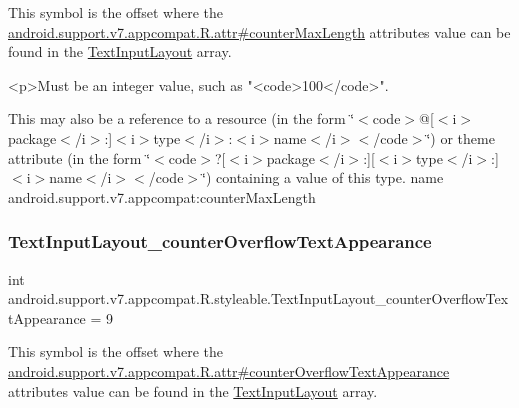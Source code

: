 This symbol is the offset where the \hyperlink{classandroid_1_1support_1_1v7_1_1appcompat_1_1R_1_1attr_a3ac08d5d35fcfeb3c8d8166422cce804}{android.\+support.\+v7.\+appcompat.\+R.\+attr\#counter\+Max\+Length} attribute\textquotesingle{}s value can be found in the \hyperlink{classandroid_1_1support_1_1v7_1_1appcompat_1_1R_1_1styleable_a618db13ebe8aab96f9d951a0d1c7d5bc}{Text\+Input\+Layout} array.

\begin{DoxyVerb}      <p>Must be an integer value, such as "<code>100</code>".
\end{DoxyVerb}
 

This may also be a reference to a resource (in the form \char`\"{}$<$code$>$@\mbox{[}$<$i$>$package$<$/i$>$\+:\mbox{]}$<$i$>$type$<$/i$>$\+:$<$i$>$name$<$/i$>$$<$/code$>$\char`\"{}) or theme attribute (in the form \char`\"{}$<$code$>$?\mbox{[}$<$i$>$package$<$/i$>$\+:\mbox{]}\mbox{[}$<$i$>$type$<$/i$>$\+:\mbox{]}$<$i$>$name$<$/i$>$$<$/code$>$\char`\"{}) containing a value of this type.  name android.\+support.\+v7.\+appcompat\+:counter\+Max\+Length \mbox{\label{classandroid_1_1support_1_1v7_1_1appcompat_1_1R_1_1styleable_af52e4bb48c3468ccf7ac636439c45789}} 
\subsubsection{\texorpdfstring{Text\+Input\+Layout\+\_\+counter\+Overflow\+Text\+Appearance}{TextInputLayout\_counterOverflowTextAppearance}}
{\footnotesize\ttfamily int android.\+support.\+v7.\+appcompat.\+R.\+styleable.\+Text\+Input\+Layout\+\_\+counter\+Overflow\+Text\+Appearance = 9\hspace{0.3cm}{\ttfamily [static]}}

This symbol is the offset where the \hyperlink{classandroid_1_1support_1_1v7_1_1appcompat_1_1R_1_1attr_a413f70c3f970308cb81b4d96766b3a20}{android.\+support.\+v7.\+appcompat.\+R.\+attr\#counter\+Overflow\+Text\+Appearance} attribute\textquotesingle{}s value can be found in the \hyperlink{classandroid_1_1support_1_1v7_1_1appcompat_1_1R_1_1styleable_a618db13ebe8aab96f9d951a0d1c7d5bc}{Text\+Input\+Layout} array.

